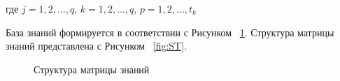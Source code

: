 где  $j = {1,2, ..., q}$, $k = {1,2, ..., q}$, $p = {1,2, ..., t_k}$

База знаний формируется в соответствии с Рисунком ~\cref{fig:KBase}. Структура матрицы знаний представлена с Рисунком ~\cref{fig:ST}.

\begin{figure}[ht]
    \caption{Структура матрицы знаний}\label{fig:KBase}
\end{figure}

